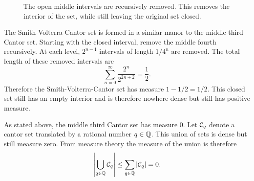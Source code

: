 \begin{figure}
    \begin{center}
    
\end{center}
\caption{The open middle intervals are recursively removed.  This removes the interior of the set, while still leaving the original set closed.  }
    \label{fig:my_label}
\end{figure}


\begin{example}
    The Smith-Volterra-Cantor set is formed in a similar manor to the middle-third Cantor set.  Starting with the closed interval, remove the middle fourth recursively.  At each level, $2^{n-1}$ intervals of length $1/4^n$ are removed.  The total length of these removed intervals are $$\sum_{n=0}^\infty \frac{2^n}{2^{2n+2}} = \frac{1}{2}.$$
    Therefore the Smith-Volterra-Cantor set has measure $1 - 1/2 = 1/2.$
    This closed set still has an empty interior and is therefore nowhere dense but still has positive measure. 
\end{example}

\begin{example}
As stated above, the middle third Cantor set has measure $0$.  Let $\mathcal{C}_q$ denote a cantor set translated by a rational number $q \in \mathbb{Q}$.  This union of sets is dense but still measure zero.  From measure theory the measure of the union is therefore
$$\left\vert \bigcup_{q \in \mathbb{Q}} \mathcal{C}_q \right\vert \leq  \sum_{q \in \mathbb{Q}}\left\vert\mathcal{C}_q\right\vert = 0.$$
\end{example}
